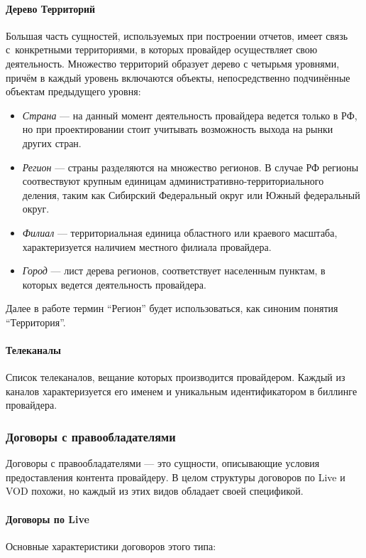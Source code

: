 \paragraph{Дерево Территорий}
Большая часть сущностей, используемых при построении отчетов, имеет связь с~конкретными территориями,
в которых провайдер осуществляет свою деятельность. Множество территорий образует дерево 
с четырьмя уровнями, причём в каждый уровень включаются объекты, непосредственно подчинённые объектам предыдущего уровня:

\begin{itemize}
\item{
  \textit{Страна} --- на данный момент деятельность провайдера ведется только в РФ, но при проектировании
  стоит учитывать возможность выхода на рынки других стран.
}
\item{
  \textit{Регион} --- страны разделяются на множество регионов. В случае РФ регионы соотвествуют
  крупным единицам административно-территориального деления, таким как Сибирский Федеральный округ 
  или Южный федеральный округ.
}
\item{
  \textit{Филиал} --- территориальная единица областного или краевого масштаба, характеризуется наличием
  местного филиала провайдера.
}
\item{
  \textit{Город} --- лист дерева регионов, соответствует населенным пунктам, в которых ведется деятельность провайдера.
}
\end{itemize}

Далее в работе термин ``Регион'' будет использоваться, как синоним понятия ``Территория''.

\paragraph{Телеканалы}
Список телеканалов, вещание которых производится провайдером. Каждый из каналов характеризуется его именем
и уникальным идентификатором в биллинге провайдера.

\subsubsection{Договоры с правообладателями}

Договоры с правообладателями --- это сущности, описывающие условия предоставления контента провайдеру.
В целом структуры договоров по Live и VOD похожи, но каждый из этих видов обладает своей спецификой.

\paragraph{Договоры по Live}
Основные характеристики договоров этого типа:

